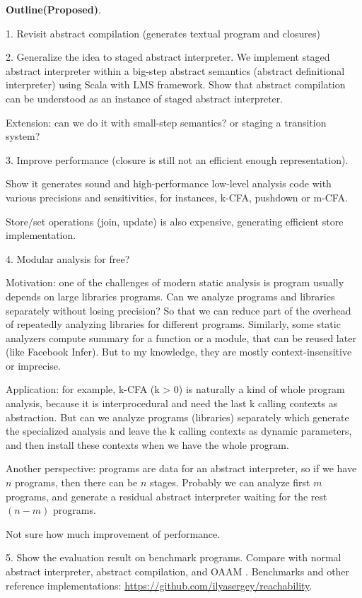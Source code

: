\documentclass[acmsmall,review,anonymous]{acmart}\settopmatter{printfolios=true,printccs=false,printacmref=false}
\begin{document}
\textbf{Outline(Proposed)}.

1. Revisit abstract compilation (generates textual program and closures) 

2. Generalize the idea to staged abstract interpreter.
We implement staged abstract interpreter within a big-step abstract semantics 
(abstract definitional interpreter) using Scala with LMS framework.  
Show that abstract compilation can be understood as an instance of staged 
abstract interpreter.

Extension: can we do it with small-step semantics? or staging a transition system?

3. Improve performance (closure is still not an efficient enough representation).

Show it generates sound and high-performance low-level analysis code with 
various precisions and sensitivities, for instances, k-CFA, pushdown or m-CFA. 

Store/set operations (join, update) is also expensive, generating efficient store implementation\cite{liang2014fast}.

4. Modular analysis for free? 

Motivation: one of the challenges of modern static analysis is program usually depends on
large libraries programs\cite{toman_et_al:LIPIcs:2017:7121}. 
Can we analyze programs and libraries separately without losing precision? So that we can 
reduce part of the overhead of repeatedly analyzing libraries for different programs.
Similarly, some static analyzers compute summary for a function or a module, that can be reused
later (like Facebook Infer). But to my knowledge, they are mostly context-insensitive or imprecise.

Application: for example, k-CFA (k > 0) is naturally a kind of whole program analysis,
because it is interprocedural and need the last k calling contexts as abstraction. 
But can we analyze programs (libraries) separately which generate the specialized 
analysis and leave the k calling contexts as dynamic parameters, 
and then install these contexts when we have the whole program.

Another perspective: programs are data for an abstract interpreter, so if we have $n$ programs, 
then there can be $n$ stages. 
Probably we can analyze first $m$ programs, and generate a residual abstract interpreter
waiting for the rest $(n-m)$ programs.

Not sure how much improvement of performance.

5. Show the evaluation result on benchmark programs. 
Compare with normal abstract interpreter, 
abstract compilation\cite{Boucher:1996:ACN:647473.727587}, and OAAM \cite{Johnson:2013:OAA:2500365.2500604}.
Benchmarks and other reference implementations: \url{https://github.com/ilyasergey/reachability}.
\end{document}
